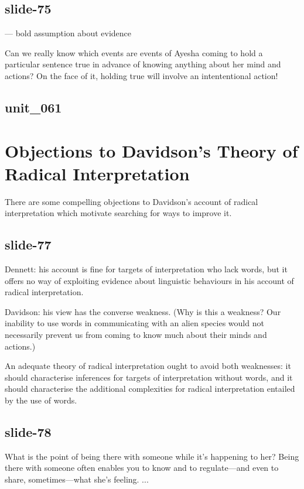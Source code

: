 \documentclass[12pt,\papersize]{extarticle}
\begin{document}
\subsection{slide-75}
--- bold assumption about evidence

Can we really know which events are events of Ayesha coming to hold a
particular sentence true in advance of knowing anything about
her mind and actions?
On the face of it, holding true will involve an intententional
action!

\subsection{unit\_061}


\section{Objections to Davidson’s Theory of Radical Interpretation}

There are some compelling objections to
Davidson’s account of radical interpretation
which motivate searching for ways to improve it.

\subsection{slide-77}
Dennett: his account is fine for targets of interpretation who lack words,
but it offers no way of exploiting evidence about
linguistic behaviours in his account of radical interpretation.

Davidson: his view has the converse weakness.
(Why is this a weakness?  Our inability to use words in communicating with
an alien species would not necessarily prevent us from coming to know
much about their minds and actions.)

An adequate theory of radical interpretation ought to avoid both weaknesses:
it should characterise inferences for targets of interpretation without words,
and it should characterise the additional complexities for radical
interpretation entailed by the use of words.

\subsection{slide-78}
What is the point of being there with someone while it’s happening to her?
Being there with someone often enables you to know and to regulate---and
even to share, sometimes---what she’s feeling. ...
\end{document}
